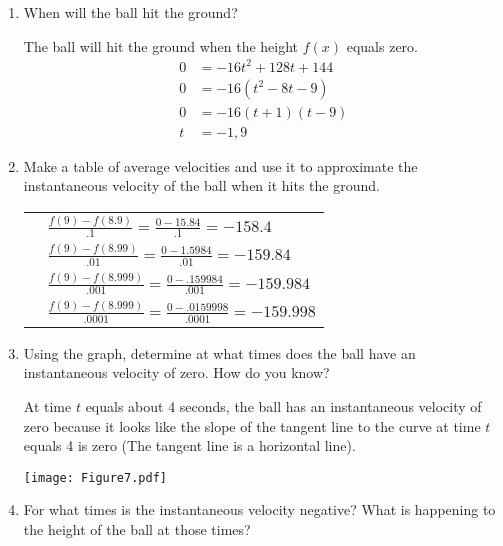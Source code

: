 \documentclass[handout,nooutcomes]{ximera}
\begin{document}
\begin{problem}
\begin{enumerate}
		\item  When will the ball hit the ground?
		\begin{freeResponse}		 
		The ball will hit the ground when the height $f(x)$ equals zero.
			\begin{align*}
			0&=-16t^2+128t+144 \\
			0&=-16(t^2-8t-9) \\
 			0&=-16(t+1)(t-9) \\
 			t&=-1,9 
 			\end{align*}
		\end{freeResponse}
		
		
	
		\item  Make a table of average velocities and use it to approximate the instantaneous velocity of the ball when it hits the ground.
		\begin{freeResponse}		 
			\begin{tabular}{|l|l|}
			\hline
			\text{Time Interval} & \text{Average Velocity}  \\
			\hline
			[8.9, 9] & $\frac{f(9)-f(8.9)}{.1}=\frac{0-15.84}{.1}=-158.4$  \\
			\hline
			[8.99,9] & $\frac{f(9)-f(8.99)}{.01}=\frac{0-1.5984}{.01}=-159.84$  \\
			\hline
			[8.999, 9] & $\frac{f(9)-f(8.999)}{.001}=\frac{0-.159984}{.001}=-159.984$  \\
			\hline
			[8.9999, 9] &  $\frac{f(9)-f(8.999)}{.0001}=\frac{0-.0159998}{.0001}=-159.998$  \\
			\hline
			\end{tabular}
		\end{freeResponse}
		
		
			
		\item  Using the graph, determine at what times does the ball have an instantaneous velocity of zero.  How do you know?
		\begin{freeResponse}		 
		At time $t$ equals about 4 seconds, the ball has an instantaneous velocity of zero because it looks like the slope of the tangent line to the curve at time $t$ equals 4 is zero (The tangent line is a horizontal line).
			\begin{image}
			\texttt{[image: Figure7.pdf]}
			\end{image}
		\end{freeResponse}
		
		
		
		\item  For what times is the instantaneous velocity negative?  What is happening to the height of the ball at those times?
			

\end{enumerate}
\end{problem}
\end{document}
